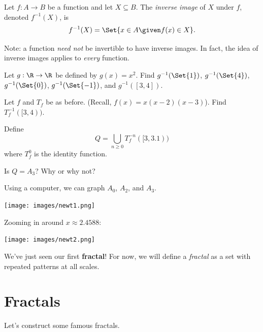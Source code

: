 	\newpage
	\begin{definition}
		Let $f:A\to B$ be a function and let $X\subseteq B$. The \emph{inverse image} of $X$
		under $f$, denoted $f^{-1}(X)$, is
		\[
			f^{-1}(X)=\Set{x\in A\given f(x)\in X}.
		\]
	\end{definition}
	Note: a function \emph{need not} be invertible to have inverse images. In fact, the idea of inverse images applies
	to \emph{every} function.

	\question
	\begin{parts}
		\item Let $g:\R\to\R$ be defined by $g(x)=x^2$. Find $g^{-1}(\Set{1})$,
			$g^{-1}(\Set{4})$, $g^{-1}(\Set{0})$, $g^{-1}(\Set{-1})$, and $g^{-1}([3,4])$.
		\item Let $f$ and $T_f$ be as before. (Recall, $f(x)=x(x-2)(x-3)$). Find $T_f^{-1}([3,4))$.
		\item Define
			\[
				Q=\bigcup_{n\geq 0} T_f^{-n}([3,3.1))
			\]
			where $T_f^0$ is the identity function.

			Is $Q=A_3$? Why or why not?
	\end{parts}

	\newpage
	Using a computer, we can graph $A_0$, $A_2$, and $A_3$.

	\begin{center}
	\texttt{[image: images/newt1.png]}
	\end{center}
	
	\newpage
	Zooming in around $x\approx 2.4588$:

	\begin{center}
	\texttt{[image: images/newt2.png]}
	\end{center}

	We've just seen our first {\bf fractal}! For now, we will define a \emph{fractal}
	as a set with repeated patterns at all scales.

	\newpage
	\section*{Fractals}
	Let's construct some famous fractals.

